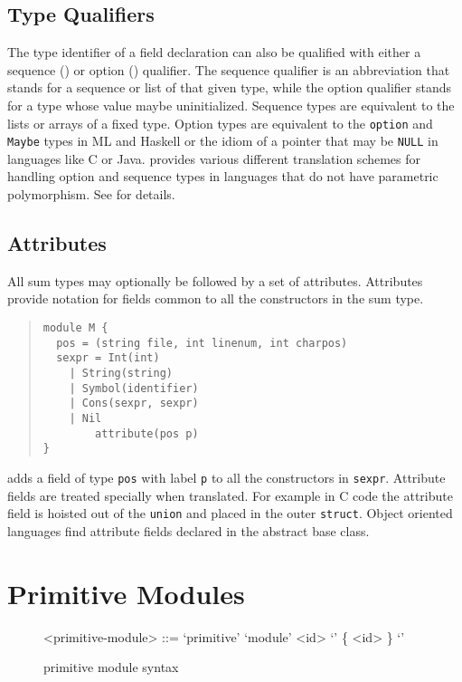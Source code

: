 \subsection{Type Qualifiers}

The type identifier of a field declaration can also be qualified with either
a sequence (\lit{*}) or option () qualifier. The sequence qualifier
is an abbreviation that stands for a sequence or list of that given type,
while the option qualifier stands for a type whose value maybe
uninitialized. Sequence types are equivalent to the lists or arrays of a
fixed type. Option types are equivalent to the \lstinline[language=ASDL]!option! and \lstinline[language=ASDL]!Maybe!
types in ML and Haskell or the idiom of a pointer that may be \lstinline[language=ASDL]!NULL! in languages like C or Java.
\asdlgen{} provides various different translation schemes for handling option
and sequence types in languages that do not have parametric polymorphism. 
See  for details.

\subsection{Attributes}
All sum types may optionally be followed by a set of
attributes. Attributes provide notation for fields common to all the
constructors in the sum type. 
\begin{quote}\begin{lstlisting}[language=ASDL]
module M {
  pos = (string file, int linenum, int charpos)
  sexpr = Int(int)
	| String(string)
	| Symbol(identifier)
	| Cons(sexpr, sexpr)
	| Nil
        attribute(pos p)
}
\end{lstlisting}\end{quote}%
adds a field of type \lstinline[language=ASDL]!pos! with label \lstinline[language=ASDL]!p! to all the constructors in
\lstinline[language=ASDL]!sexpr!. Attribute fields are treated specially when
translated. For example in C code the attribute field is hoisted out of the
\lstinline[language=ASDL]!union! and placed in the outer \lstinline[language=ASDL]!struct!. Object oriented languages
find attribute fields declared in the abstract base class. 

\section{Primitive Modules}
\begin{figure}[ht]
  \begin{center}
    \begin{grammar}
      <primitive-module> ::= `primitive' `module' <id> `{' \{ <id> \} `}'
    \end{grammar}%
  \end{center}%
  \caption{\asdl{} primitive module syntax}
\end{figure}%

